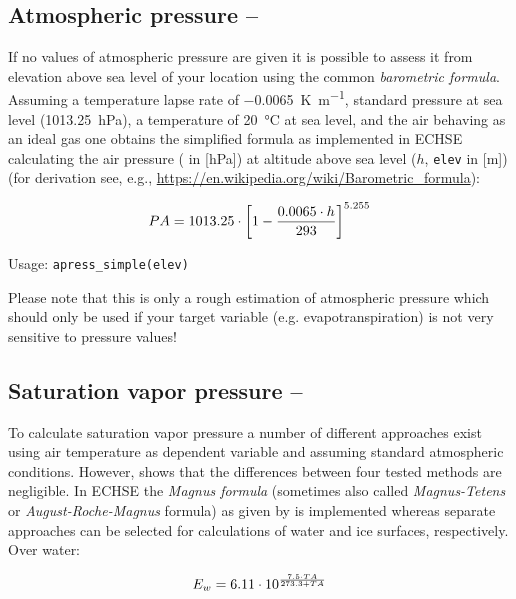 \subsection{Atmospheric pressure -- \airPressure} \label{sec:meteo:apress}
If no values of atmospheric pressure are given it is possible to assess it from elevation above sea level of your location using the common \emph{barometric formula}. Assuming a temperature lapse rate of \SI{-0.0065}{\kelvin\per\metre}, standard pressure at sea level (\SI{1013.25}{\hecto\pascal}), a temperature of \SI{20}{\degreeCelsius} at sea level, and the air behaving as an ideal gas one obtains the simplified formula as implemented in ECHSE calculating the air pressure (\airPressure{} in [\si{\hecto\pascal}]) at altitude above sea level ($h$, \verb!elev! in [\si{\metre}]) (for derivation see, e.g., \url{https://en.wikipedia.org/wiki/Barometric_formula}):

\begin{equation} \label{eqn:meteo:apress}
  PA{} = 1013.25 \cdot \left[ 1 - \frac{0.0065 \cdot h}{293} \right]^{5.255}
\end{equation}

\noindent
Usage:
\verb!apress_simple(elev)!

Please note that this is only a rough estimation of atmospheric pressure which should only be used if your target variable (e.g. evapotranspiration) is not very sensitive to pressure values!



\subsection{Saturation vapor pressure -- \satVaporPressure} \label{sec:meteo:satvappress}
To calculate saturation vapor pressure a number of different approaches exist using air temperature as dependent variable and assuming standard atmospheric conditions. However,  shows that the differences between four tested methods are negligible. In ECHSE the \emph{Magnus formula} (sometimes also called \emph{Magnus-Tetens} or \emph{August-Roche-Magnus} formula) as given by \citet{Dyck1995} is implemented whereas separate approaches can be selected for calculations of water and ice surfaces, respectively.\\

\noindent
Over water:

\begin{equation} \label{eqn:meteo:satVapPressWater}
E_w{} = 6.11 \cdot 10^{\frac{7.5 \cdot TA{}}{273.3 + TA{}}}
\end{equation}

